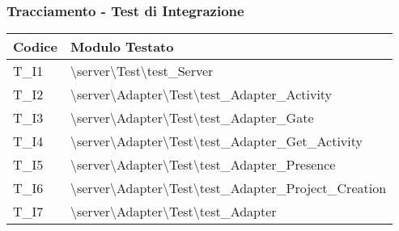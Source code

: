 \subsubsection{Tracciamento - Test di Integrazione}
\renewcommand{\arraystretch}{1.8}
\begin{tabular}{|m{6em}|m{33em}|}
    \hline
    \textbf{Codice} & \textbf{Modulo Testato} \\
    \hline
    T\_I1 & \textbackslash server\textbackslash Test\textbackslash test\_Server\\
    \hline
    T\_I2 & \textbackslash server\textbackslash Adapter\textbackslash Test\textbackslash test\_Adapter\_Activity  \\
    \hline
    T\_I3 & \textbackslash server\textbackslash Adapter\textbackslash Test\textbackslash test\_Adapter\_Gate \\
    \hline
    T\_I4 & \textbackslash server\textbackslash Adapter\textbackslash Test\textbackslash test\_Adapter\_Get\_Activity \\
    \hline
    T\_I5 & \textbackslash server\textbackslash Adapter\textbackslash Test\textbackslash test\_Adapter\_Presence  \\
    \hline
    T\_I6 & \textbackslash server\textbackslash Adapter\textbackslash Test\textbackslash test\_Adapter\_Project\_Creation  \\
    \hline 
    T\_I7 &  \textbackslash server\textbackslash Adapter\textbackslash Test\textbackslash test\_Adapter \\
    \hline 
\end{tabular}


